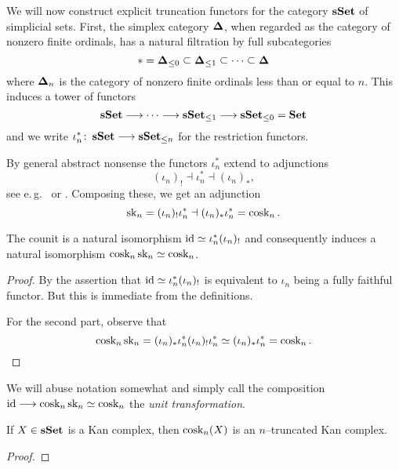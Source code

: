 We will now construct explicit truncation functors for the category
\(\operatorname{\textnormal{\bfseries sSet}}\) of simplicial sets. First, the simplex category
\(\operatorname{\mathbf{\Delta}}\), when regarded as the category of nonzero finite
ordinals, has a natural filtration by full subcategories
\[
* = \simplex_{\leq 0} \subset \simplex_{\leq 1} \subset\cdots\subset\simplex
\]
where \(\operatorname{\mathbf{\Delta}}_n\) is the category of nonzero finite ordinals less than
or equal to \(n\). This induces a tower of functors
\[
\operatorname{\textnormal{\bfseries sSet}} \longrightarrow \cdots \longrightarrow \operatorname{\textnormal{\bfseries sSet}}_{\leq 1} \longrightarrow \operatorname{\textnormal{\bfseries sSet}}_{\leq 0} = \operatorname{\textnormal{\bfseries Set}}
\]
and we write \(\iota_n^*\colon \operatorname{\textnormal{\bfseries sSet}} \longrightarrow \operatorname{\textnormal{\bfseries sSet}}_{\leq n}\) for the
restriction functors.

By general abstract nonsense the functors \(\iota_n^*\) extend to
adjunctions
\[
(\iota_n)_! \dashv \iota_n^* \dashv (\iota_n)_*,
\]
see e.\,g.~\cite[Theorem~4, p.~59]{sheavesgeometrylogic} or
\cite[{Exposé}~i, Proposition~5.1]{SGA4-1}. Composing these, we get an
adjunction
\[
\operatorname{\textnormal{sk}}_n = (\iota_n)_{!}\iota_n^{*} \dashv (\iota_n)_{*}\iota_n^{*} = \operatorname{\textnormal{cosk}}_n.
\]

\begin{lemma}\label{lem:cosk_sk_composition}
  The counit is a natural isomorphism \(\operatorname{\textnormal{id}} \simeq
  \iota_{n}^{*}(\iota_{n})_{!}\) and consequently induces a natural isomorphism
  \(\operatorname{\textnormal{cosk}}_{n}\operatorname{\textnormal{sk}}_{n}\simeq \operatorname{\textnormal{cosk}}_{n}\).
\end{lemma}
\begin{proof}
  By \cite[{Exposé}~i, Proposition~5.6]{SGA4-1} the assertion that
  \(\operatorname{\textnormal{id}}\simeq\iota_n^{*}(\iota_n)_{!}\) is equivalent to \(\iota_{n}\)
  being a fully faithful functor. But this is immediate from the
  definitions.

  For the second part, observe that
\[
  \operatorname{\textnormal{cosk}}_n\operatorname{\textnormal{sk}}_n = (\iota_n)_{*}\iota_n^{*}(\iota_{n})_{!}\iota_n^{*}
  \simeq (\iota_n)_{*}\iota_n^{*} = \operatorname{\textnormal{cosk}}_{n}.\qedhere
\]
\end{proof}

We will abuse notation somewhat and simply call the composition
\(\operatorname{\textnormal{id}}\longrightarrow\operatorname{\textnormal{cosk}}_{n}\operatorname{\textnormal{sk}}_{n}\simeq\operatorname{\textnormal{cosk}}_{n}\) the \emph{unit transformation}.

\begin{proposition}\label{prop:cosk-is-truncated}
  If \(X\in\operatorname{\textnormal{\bfseries sSet}}\) is a Kan complex, then  \(\operatorname{\textnormal{cosk}}_n(X)\) is an
  \(n\)--truncated Kan complex.
\end{proposition}
\begin{proof}
\end{proof}


